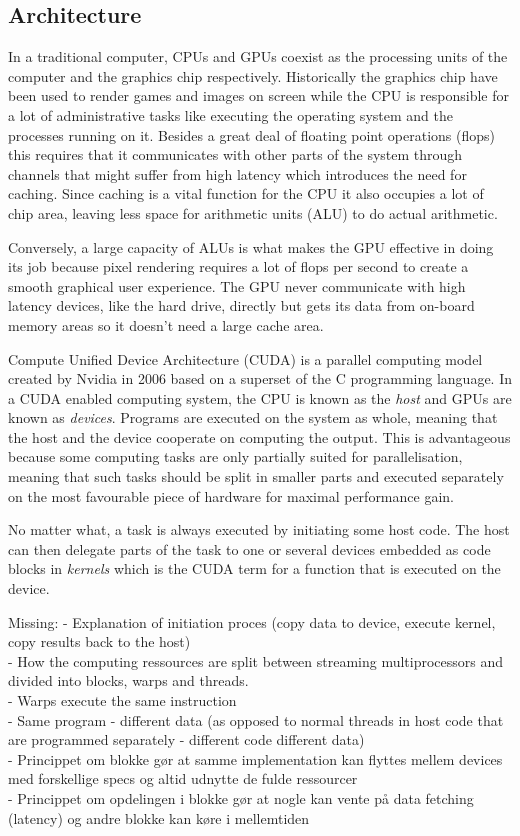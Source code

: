 
\subsection{Architecture}
In a traditional computer, CPUs and GPUs coexist as the processing units of the computer and the graphics chip respectively. Historically the graphics chip have been used to render games and images on screen while the CPU is responsible for a lot of administrative tasks like executing the operating system and the processes running on it. Besides a great deal of floating point operations (flops) this requires that it communicates with other parts of the system through channels that might suffer from high latency which introduces the need for caching. Since caching is a vital function for the CPU it also occupies a lot of chip area, leaving less space for arithmetic units (ALU) to do actual arithmetic. 

Conversely, a large capacity of ALUs is what makes the GPU effective in doing its job because pixel rendering requires a lot of flops per second to create a smooth graphical user experience. The GPU never communicate with high latency devices, like the hard drive, directly but gets its data from on-board memory areas so it doesn't need a large cache area.

Compute Unified Device Architecture (CUDA) is a parallel computing model created by Nvidia in 2006 based on a superset of the C programming language. In a CUDA enabled computing system, the CPU is known as the \emph{host} and GPUs are known as \emph{devices}. Programs are executed on the system as whole, meaning that the host and the device cooperate on computing the output. This is advantageous because some computing tasks are only partially suited for parallelisation, meaning that such tasks should be split in smaller parts and executed separately on the most favourable piece of hardware for maximal performance gain. 

No matter what, a task is always executed by initiating some host code. The host can then delegate parts of the task to one or several devices embedded as code blocks in \emph{kernels} which is the CUDA term for a function that is executed on the device.

Missing: 
- Explanation of initiation proces (copy data to device, execute kernel, copy results back to the host) \\
- How the computing ressources are split between streaming multiprocessors and divided into blocks, warps and threads. \\
- Warps execute the same instruction \\
- Same program - different data (as opposed to normal threads in host code that are programmed separately  - different code different data) \\
- Princippet om blokke gør at samme implementation kan flyttes mellem devices med forskellige specs og altid udnytte de fulde ressourcer \\
- Princippet om opdelingen i blokke gør at nogle kan vente på data fetching (latency) og andre blokke kan køre i mellemtiden


